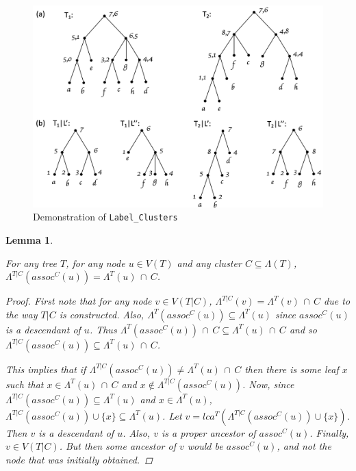 \documentclass{article}
\newcommand{\leafset}{\Lambda}
\newtheorem{assocnode}[incompatibility]{Lemma}
\begin{document}
    \begin{figure}[h]
        \includegraphics[scale=0.5]{labelclusters}
        \centering
        \caption{Demonstration of \texttt{Label\_Clusters}}
        \label{fig:labelclusters}
    \end{figure}

    \bigskip
    \begin{assocnode}
        \label{lem:assocnode}

        For any tree $T$, for any node $u \in V(T)$ and any cluster $C \subseteq \leafset(T)$, $\leafset^{T|C}(assoc^C(u)) = \leafset^{T}(u)\, \cap\, C$.

        \begin{proof}
            First note that for any node $v \in V(T|C)$, $\leafset^{T|C}(v) = \leafset^{T}(v)\, \cap\, C$ due to the way $T|C$ is constructed. Also, $\leafset^{T}(assoc^C(u)) \subseteq \leafset^{T}(u)$ since $assoc^C(u)$ is a descendant of $u$. Thus $\leafset^{T}(assoc^C(u))\, \cap\, C \subseteq \leafset^{T}(u)\, \cap\, C$ and so $\leafset^{T|C}(assoc^C(u)) \subseteq \leafset^{T}(u)\, \cap\, C$.

            This implies that if $\leafset^{T|C}(assoc^C(u)) \neq \leafset^{T}(u)\, \cap\, C$ then there is some leaf $x$ such that $x \in \leafset^{T}(u)\, \cap\, C$ and $x \not\in \leafset^{T|C}(assoc^C(u))$. Now, since $\leafset^{T|C}(assoc^C(u)) \subseteq \leafset^{T}(u)$ and $x \in \leafset^{T}(u)$, $\leafset^{T|C}(assoc^C(u)) \cup \{x\} \subseteq \leafset^{T}(u)$. Let $v = lca^T(\leafset^{T|C}(assoc^C(u)) \cup \{x\})$. Then $v$ is a descendant of $u$. Also, $v$ is a proper ancestor of $assoc^C(u)$. Finally, $v \in V(T|C)$. But then some ancestor of $v$ would be $assoc^C(u)$, and not the node that was initially obtained.
        \end{proof}
    \end{assocnode}
\end{document}

